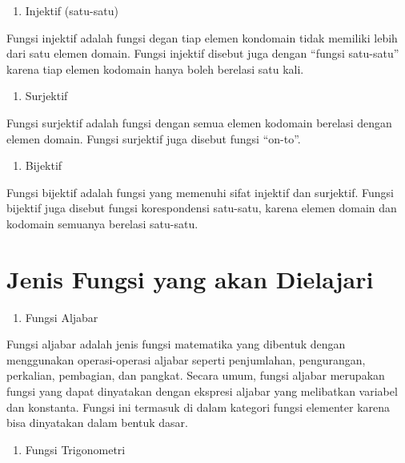 \documentclass[
]{book}
\providecommand{\tightlist}{%
  \setlength{\itemsep}{0pt}\setlength{\parskip}{0pt}}
\begin{document}
\begin{enumerate}
\def\labelenumi{\arabic{enumi}.}
\tightlist
\item
  Injektif (satu-satu)
\end{enumerate}

Fungsi injektif adalah fungsi degan tiap elemen kondomain tidak memiliki lebih dari satu elemen domain. Fungsi injektif disebut juga dengan ``fungsi satu-satu'' karena tiap elemen kodomain hanya boleh berelasi satu kali.

\begin{enumerate}
\def\labelenumi{\arabic{enumi}.}
\setcounter{enumi}{1}
\tightlist
\item
  Surjektif
\end{enumerate}

Fungsi surjektif adalah fungsi dengan semua elemen kodomain berelasi dengan elemen domain. Fungsi surjektif juga disebut fungsi ``on-to''.

\begin{enumerate}
\def\labelenumi{\arabic{enumi}.}
\setcounter{enumi}{2}
\tightlist
\item
  Bijektif
\end{enumerate}

Fungsi bijektif adalah fungsi yang memenuhi sifat injektif dan surjektif. Fungsi bijektif juga disebut fungsi korespondensi satu-satu, karena elemen domain dan kodomain semuanya berelasi satu-satu.

\section{Jenis Fungsi yang akan Dielajari}\label{jenis-fungsi-yang-akan-dielajari}

\begin{enumerate}
\def\labelenumi{\arabic{enumi}.}
\tightlist
\item
  Fungsi Aljabar
\end{enumerate}

Fungsi aljabar adalah jenis fungsi matematika yang dibentuk dengan menggunakan operasi-operasi aljabar seperti penjumlahan, pengurangan, perkalian, pembagian, dan pangkat. Secara umum, fungsi aljabar merupakan fungsi yang dapat dinyatakan dengan ekspresi aljabar yang melibatkan variabel dan konstanta. Fungsi ini termasuk di dalam kategori fungsi elementer karena bisa dinyatakan dalam bentuk dasar.

\begin{enumerate}
\def\labelenumi{\arabic{enumi}.}
\setcounter{enumi}{1}
\tightlist
\item
  Fungsi Trigonometri
\end{enumerate}
\end{document}
